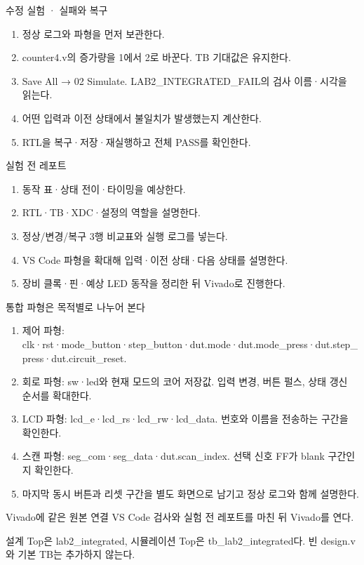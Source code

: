 \begin{frame}{수정 실험 · 실패와 복구}
\small
\begin{enumerate}
\item 정상 로그와 파형을 먼저 보관한다.
\item counter4.v의 증가량을 1에서 2로 바꾼다. TB 기대값은 유지한다.
\item Save All → 02 Simulate. LAB2\_INTEGRATED\_FAIL의 검사 이름·시각을 읽는다.
\item 어떤 입력과 이전 상태에서 불일치가 발생했는지 계산한다.
\item RTL을 복구·저장·재실행하고 전체 PASS를 확인한다.
\end{enumerate}
\end{frame}

\begin{frame}[label=reports]{실험 전 레포트}
\small
\begin{enumerate}
\item 동작 표·상태 전이·타이밍을 예상한다.
\item RTL·TB·XDC·설정의 역할을 설명한다.
\item 정상/변경/복구 3행 비교표와 실행 로그를 넣는다.
\item VS Code 파형을 확대해 입력·이전 상태·다음 상태를 설명한다.
\item 장비 클록·핀·예상 LED 동작을 정리한 뒤 Vivado로 진행한다.
\end{enumerate}
\end{frame}

\begin{frame}{통합 파형은 목적별로 나누어 본다}
\small
\begin{enumerate}
\item 제어 파형: clk·rst·mode\_button·step\_button·dut.mode·dut.mode\_press·dut.step\_press·dut.circuit\_reset.
\item 회로 파형: sw·led와 현재 모드의 코어 저장값. 입력 변경, 버튼 펄스, 상태 갱신 순서를 확대한다.
\item LCD 파형: lcd\_e·lcd\_rs·lcd\_rw·lcd\_data. 번호와 이름을 전송하는 구간을 확인한다.
\item 스캔 파형: seg\_com·seg\_data·dut.scan\_index. 선택 신호 FF가 blank 구간인지 확인한다.
\item 마지막 동시 버튼과 리셋 구간을 별도 화면으로 남기고 정상 로그와 함께 설명한다.
\end{enumerate}
\end{frame}

\begin{frame}[label=implementation]{Vivado에 같은 원본 연결}
\small
VS Code 검사와 실험 전 레포트를 마친 뒤 Vivado를 연다.\par\vspace{0.26cm}설계 Top은 lab2\_integrated, 시뮬레이션 Top은 tb\_lab2\_integrated다. 빈 design.v와 기본 TB는 추가하지 않는다.\par
\end{frame}

